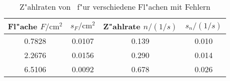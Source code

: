 \begin{table}[H]
\caption{Z"ahlraten von \samarium~f"ur verschiedene Fl"achen mit Fehlern}
\begin{center}
\begin{tabular}{|c|c|c|c|}
  \hline
  Fl"ache $F / \text{cm}^2$ & $s_F / \text{cm}^2$ & Z"ahlrate $n / (1/s)$ & $s_n / (1/s)$ \\ \hline 
  0.7828 & 0.0107 & 0.139 & 0.010 \\ \hline
  2.2676 & 0.0156 & 0.290 & 0.014 \\ \hline
  6.5106 & 0.0092 & 0.678 & 0.026 \\ \hline
\end{tabular}
\end{center}
\label{tab:data:samarium}
\end{table}
